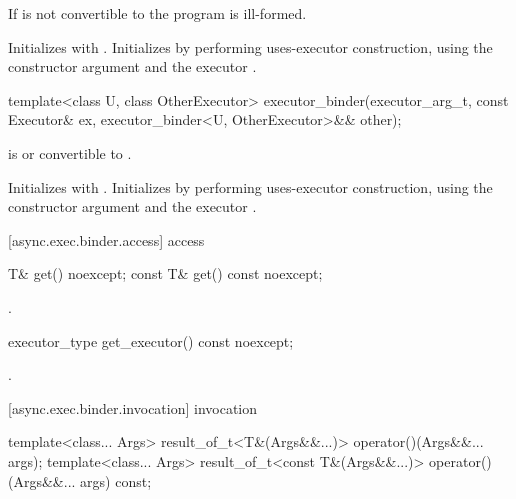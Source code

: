 \begin{itemdescr}
\pnum
\requires If  is not convertible to  the program is ill-formed.

\pnum
\effects Initializes  with . Initializes  by performing uses-executor construction, using the constructor argument  and the executor .
\end{itemdescr}

\begin{itemdecl}
template<class U, class OtherExecutor>
  executor_binder(executor_arg_t, const Executor& ex,
    executor_binder<U, OtherExecutor>&& other);
\end{itemdecl}

\begin{itemdescr}
\pnum
\requires {} is  or convertible to .

\pnum
\effects Initializes  with . Initializes  by performing uses-executor construction, using the constructor argument  and the executor .
\end{itemdescr}



[async.exec.binder.access]{ access}

%
\begin{itemdecl}
T& get() noexcept;
const T& get() const noexcept;
\end{itemdecl}

\begin{itemdescr}
\pnum
\returns {}.
\end{itemdescr}

%
\begin{itemdecl}
executor_type get_executor() const noexcept;
\end{itemdecl}

\begin{itemdescr}
\pnum
\returns {}.
\end{itemdescr}



[async.exec.binder.invocation]{ invocation}

%
\begin{itemdecl}
template<class... Args>
  result_of_t<T&(Args&&...)> operator()(Args&&... args);
template<class... Args>
  result_of_t<const T&(Args&&...)> operator()(Args&&... args) const;
\end{itemdecl}

